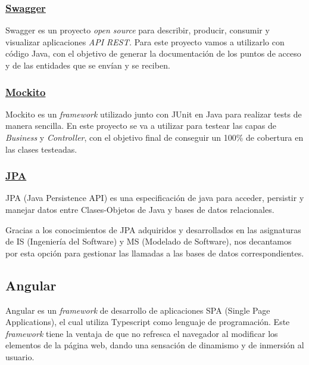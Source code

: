     

        \subsubsection{\underline{Swagger}}
        Swagger\cite{swagger} es un proyecto \textit{open source} para describir, producir, consumir y visualizar aplicaciones \textit{API REST.} Para este proyecto vamos a utilizarlo con código Java, con el objetivo de generar la documentación de los puntos de acceso y de las entidades que se envían y se reciben.

        
        \subsubsection{\underline{Mockito}}
        Mockito\cite{mockito} es un \textit{framework} utilizado junto con JUnit\cite{junit} en Java para realizar tests de manera sencilla. En este proyecto se va a utilizar para testear las capas de \emph{Business} y \emph{Controller}, con el objetivo final de conseguir un 100\% de cobertura en las clases testeadas.
        \newline
        

        \subsubsection{\underline{JPA}}
        JPA\cite{jpa} (Java Persistence API) es una especificación de java para acceder, persistir y manejar datos entre Clases-Objetos de Java y bases de datos relacionales.
        \newline
        
        Gracias a los conocimientos de JPA adquiridos y desarrollados en las asignaturas de IS (Ingeniería del Software) y MS (Modelado de Software), nos decantamos por esta opción para gestionar las llamadas a las bases de datos correspondientes.
        

     \subsection{Angular}
       Angular\cite{angular} es un \textit{framework} de desarrollo de aplicaciones SPA (Single Page Applications), el cual utiliza Typescript como lenguaje de programación. Este \textit{framework} tiene la ventaja de que no refresca el navegador al modificar los elementos de la página web, dando una sensación de dinamismo y de inmersión al usuario.
       \newline
       
